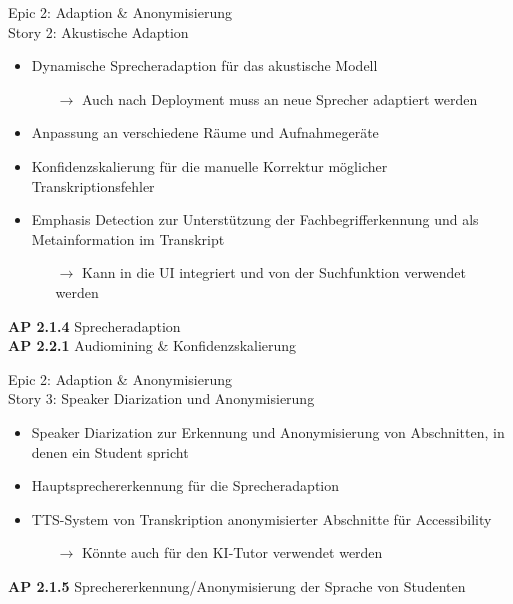 \documentclass[aspectratio=169,xcolor=dvipsnames]{beamer}
\begin{document}

\begin{frame}{Epic 2: Adaption \& Anonymisierung \\ Story 2: Akustische Adaption}
    \begin{itemize}
        \item Dynamische Sprecheradaption für das akustische Modell
        \begin{itemize}
            \item[$\rightarrow$] Auch nach Deployment muss an neue Sprecher adaptiert werden    
        \end{itemize}
        \item Anpassung an verschiedene Räume und Aufnahmegeräte
        \item Konfidenzskalierung für die manuelle Korrektur möglicher Transkriptionsfehler
        \item Emphasis Detection zur Unterstützung der Fachbegrifferkennung und als Metainformation im Transkript
        \begin{itemize}
            \item[$\rightarrow$] Kann in die UI integriert und von der Suchfunktion verwendet werden
        \end{itemize}
    \end{itemize}
\vfill    
\scriptsize \textbf{AP 2.1.4} Sprecheradaption\\
\textbf{AP 2.2.1} Audiomining \& Konfidenzskalierung

\end{frame}


\begin{frame}{Epic 2: Adaption \& Anonymisierung \\ Story 3: Speaker Diarization und Anonymisierung}
    \begin{itemize}
        \item Speaker Diarization zur Erkennung und Anonymisierung von Abschnitten, in denen ein Student spricht
        \item Hauptsprechererkennung für die Sprecheradaption
        \item TTS-System von Transkription anonymisierter Abschnitte für Accessibility
        \begin{itemize}
            \item[$\rightarrow$] Könnte auch für den KI-Tutor verwendet werden
        \end{itemize}
    \end{itemize}
\vfill    
\scriptsize\textbf{AP 2.1.5} Sprechererkennung/Anonymisierung der Sprache von Studenten
\end{frame}
\end{document}
